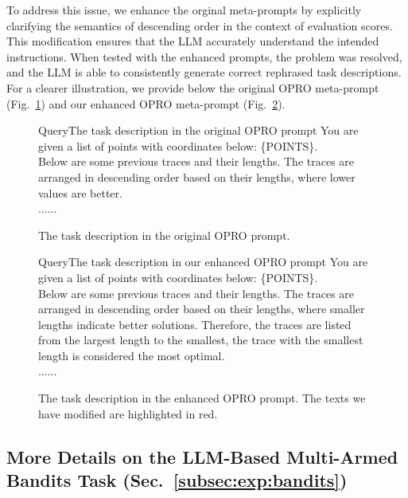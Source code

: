 To address this issue, we enhance the orginal meta-prompts by explicitly clarifying the semantics of descending order in the context of evaluation scores. This modification ensures that the LLM accurately understand the intended instructions. When tested with the enhanced prompts, the problem was resolved, and the LLM is able to consistently generate correct rephrased task descriptions.
For a clearer illustration, we provide below the original OPRO meta-prompt (Fig.~\ref{fig:original:opro:prompt}) and our enhanced OPRO meta-prompt (Fig.~\ref{fig:enhanced:opro:prompt}).


\begin{figure}[H]
\begin{mycolorbox}{Query}{The task description in the original OPRO prompt}
\small
You are given a list of points with coordinates below: \{POINTS\}.\\
Below are some previous traces and their lengths. 
The traces are arranged in descending order based on their lengths, 
where lower values are better. \\
......
\end{mycolorbox}
\caption{The task description in the original OPRO prompt.}
\label{fig:original:opro:prompt}
\end{figure}



\begin{figure}[H]
\begin{mycolorbox}{Query}{The task description in our enhanced OPRO prompt}
\small
You are given a list of points with coordinates below: \{POINTS\}.\\
Below are some previous traces and their lengths. The traces are arranged in descending order based on their lengths, where {\color{red}smaller lengths indicate better solutions}. {\color{red}Therefore, the traces are listed from the largest length to the smallest, the trace with the smallest length is considered the most optimal}. \\
......
\end{mycolorbox}
\caption{The task description in the enhanced OPRO prompt. The texts we have modified are highlighted in {\color{red}red}.}
\label{fig:enhanced:opro:prompt}
\end{figure}



\subsection{More Details on the LLM-Based Multi-Armed Bandits Task (Sec.~\ref{subsec:exp:bandits})}

